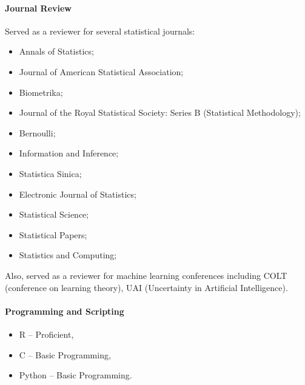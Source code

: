 \documentclass[10pt]{article}
\numberwithin{myalgctr}{section}
\begin{document}
\paragraph{Journal Review}
Served as a reviewer for several statistical journals:
\begin{itemize}
    \item Annals of Statistics;
    \item Journal of American Statistical Association;
    \item Biometrika;
    \item Journal of the Royal Statistical Society: Series B (Statistical Methodology);
    \item Bernoulli;
    \item Information and Inference;
    \item Statistica Sinica;
    \item Electronic Journal of Statistics;
    \item Statistical Science;
    \item Statistical Papers;
    \item Statistics and Computing;
\end{itemize}
Also, served as a reviewer for machine learning conferences including COLT (conference on learning theory), UAI (Uncertainty in Artificial Intelligence). 
\paragraph{Programming and Scripting}
\begin{itemize}\itemsep0em
\item R -- Proficient,
\item C -- Basic Programming,
\item Python -- Basic Programming.
\end{itemize}
\end{document}

